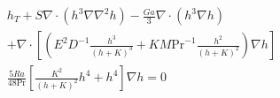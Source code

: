 \documentclass[a4paper,12pt]{article}
\begin{document}
% 

\begin{align} \label{evolution1}
 h_T + S \nabla \cdot (h^3 \nabla \nabla^2 h) - \frac{Ga}{3} \nabla \cdot (h^3 \nabla h)  \nonumber \\
+ \nabla \cdot \left[ \left( E^2 D^{-1} \frac{h^3}{(h + K)^3} + KM\text{Pr}^{-1} \frac{h^2}{(h + K)^2} \right) \nabla h \right] \nonumber \\
 \frac{5 Ra}{48 \text{Pr}} \left[ \frac{K^2}{(h + K)^2}h^4 + h^4\right] \nabla h = 0 
\end{align}
\end{document}
